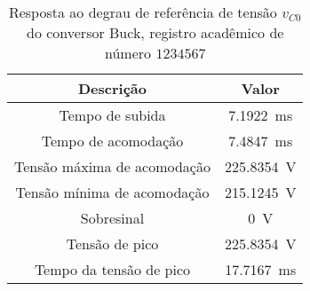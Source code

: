 \begin{table}[!ht]
\centering
\caption{Resposta ao degrau de referência de tensão $v_{C0}$ do conversor Buck, registro acadêmico de número $1234567$}
\label{tab:parametros}
\begin{tabular}{@{}cc@{}}
\toprule
\textbf{Descrição} & \textbf{Valor}\\ \midrule
Tempo de subida & \SI{7.1922}{\milli\s}\\
Tempo de acomodação & \SI{7.4847}{\milli\s}\\
Tensão máxima de acomodação & \SI{225.8354}{\V}\\
Tensão mínima de acomodação & \SI{215.1245}{\V}\\
Sobresinal & \SI{0}{\V}\\
Tensão de pico & \SI{225.8354}{\V}\\
Tempo da tensão de pico & \SI{17.7167}{\milli\s}\\
\bottomrule
\end{tabular}
\end{table}

